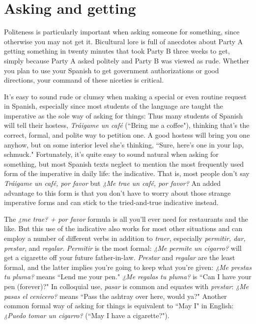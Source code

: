 \section{Asking and getting}

Politeness is particularly important when asking someone for
something, since otherwise you may not get it. Bicultural lore is full of
anecdotes about Party A getting something in twenty minutes that
took Party B three weeks to get, simply because Party A asked politely
and Party B was viewed as rude. Whether you plan to use your Spanish
to get government authorizations or good directions, your command of
these niceties is critical.

It's easy to sound rude or clumsy when making a special or
even routine request in Spanish, especially since most students of the
language are taught the imperative as the sole way of asking for things:
Thus many students of Spanish will tell their hostess, \emph{Tráigame un café} (``Bring me a coffee"), thinking that's the correct, formal, and polite way to petition one. A good hostess will bring you one anyhow,
but on some interior level she's thinking, ``Sure, here's one in your lap,
schmuck." Fortunately, it's quite easy to sound natural when asking
for something, but most Spanish texts neglect to mention the most frequently used form of the imperative in daily life: the indicative. That
is, most people don't say \emph{Tráigame un café, por favor} but \emph{¿Me trae un
	café, por favor?} An added advantage to this form is that you don't have
to worry about those strange imperative forms and can stick to the
tried-and-true indicative instead.

The \emph{¿me trae? + por favor} formula is all you'll ever need for
restaurants and the like. But this use of the indicative also works for
most other situations and can employ a number of different verbs in
addition to \emph{traer}, especially \emph{permitir, dar, prestar}, and \emph{regalar}. \emph{Permitir} is the most formal: \emph{¿Me permite un cigarro?} will get a cigarette off
your future father-in-law. \emph{Prestar} and \emph{regalar} are the least formal, and
the latter implies you're going to keep what you're given: \emph{¿Me prestas
	tu pluma?} means ``Lend me your pen." \emph{¿Me regalas tu pluma?} is ``Can
I have your pen (forever)?" In colloquial use, \emph{pasar} is common and
equates with \emph{prestar}: \emph{¿Me pasas el cenicero?} means ``Pass the ashtray
over here, would ya?" Another common formal way of asking for
things is equivalent to ``May I" in English: \emph{¿Puedo tomar un cigarro?}
(``May I have a cigarette?").

